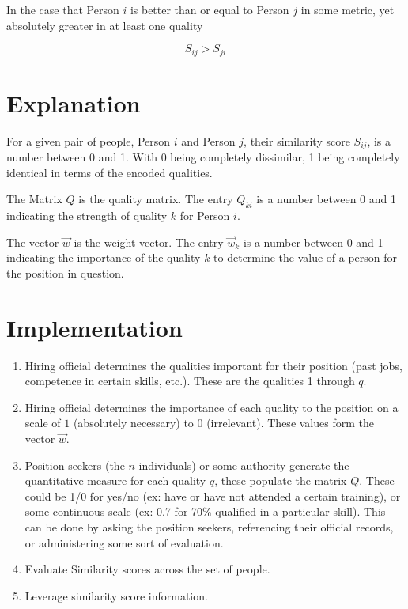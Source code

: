 \documentclass{article}
\begin{document}
In the case that Person $i$ is better than or equal to Person $j$ in some metric, yet absolutely greater in at least one quality

\[S_{ij} > S_{ji}\]

\section{Explanation}

For a given pair of people, Person $i$ and Person $j$, their similarity score $S_{ij}$, is a number between 0 and 1. With 0 being completely dissimilar, 1 being completely identical in terms of the encoded qualities. 

The Matrix $Q$ is the quality matrix. The entry $Q_{ki}$ is a number between 0 and 1 indicating the strength of quality $k$ for Person $i$.

The vector $\vec{w}$ is the weight vector. The entry $\vec{w}_k$ is a number between 0 and 1 indicating the importance of the quality $k$ to determine the value of a person for the position in question.


\section{Implementation}

\begin{enumerate}
\item Hiring official determines the qualities important for their position (past jobs, competence in certain skills, etc.). These are the qualities 1 through $q$.
\item Hiring official determines the importance of each quality to the position on a scale of $1$ (absolutely necessary) to $0$ (irrelevant). These values form the vector $\vec{w}$.
\item Position seekers (the $n$ individuals) or some authority generate the quantitative measure for each quality $q$, these populate the matrix $Q$. These could be 1/0 for yes/no (ex: have or have not attended a certain training), or some continuous scale (ex: 0.7 for 70\% qualified in a particular skill). This can be done by asking the position seekers, referencing their official records, or administering some sort of evaluation.
\item Evaluate Similarity scores across the set of people.
\item Leverage similarity score information.
\end{enumerate}
\end{document}

